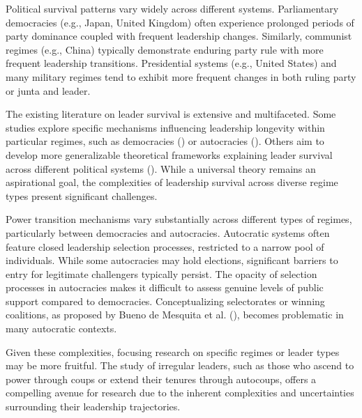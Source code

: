 \documentclass[
  12pt,
]{article}
\begin{document}
Political survival patterns vary widely across different systems.
Parliamentary democracies (e.g., Japan, United Kingdom) often experience
prolonged periods of party dominance coupled with frequent leadership
changes. Similarly, communist regimes (e.g., China) typically
demonstrate enduring party rule with more frequent leadership
transitions. Presidential systems (e.g., United States) and many
military regimes tend to exhibit more frequent changes in both ruling
party or junta and leader.

The existing literature on leader survival is extensive and
multifaceted. Some studies explore specific mechanisms influencing
leadership longevity within particular regimes, such as democracies
() or autocracies
(). Others aim to develop more generalizable theoretical frameworks
explaining leader survival across different political systems
().
While a universal theory remains an aspirational goal, the complexities
of leadership survival across diverse regime types present significant
challenges.

Power transition mechanisms vary substantially across different types of
regimes, particularly between democracies and autocracies. Autocratic
systems often feature closed leadership selection processes, restricted
to a narrow pool of individuals. While some autocracies may hold
elections, significant barriers to entry for legitimate challengers
typically persist. The opacity of selection processes in autocracies
makes it difficult to assess genuine levels of public support compared
to democracies. Conceptualizing selectorates or winning coalitions, as
proposed by Bueno de Mesquita et al.
(), becomes problematic in many
autocratic contexts.

Given these complexities, focusing research on specific regimes or
leader types may be more fruitful. The study of irregular leaders, such
as those who ascend to power through coups or extend their tenures
through autocoups, offers a compelling avenue for research due to the
inherent complexities and uncertainties surrounding their leadership
trajectories.
\end{document}
